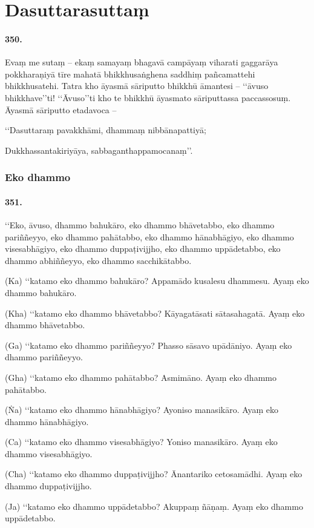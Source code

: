 \section{Dasuttarasuttaṃ}

\paragraph{350.} Evaṃ me sutaṃ – ekaṃ samayaṃ bhagavā campāyaṃ viharati gaggarāya pokkharaṇiyā tīre mahatā bhikkhusaṅghena saddhiṃ pañcamattehi bhikkhusatehi. Tatra kho āyasmā sāriputto bhikkhū āmantesi – ‘‘āvuso bhikkhave’’ti! ‘‘Āvuso’’ti kho te bhikkhū āyasmato sāriputtassa paccassosuṃ. Āyasmā sāriputto etadavoca –

‘‘Dasuttaraṃ pavakkhāmi, dhammaṃ nibbānapattiyā;

Dukkhassantakiriyāya, sabbaganthappamocanaṃ’’.

\subsubsection{Eko dhammo}

\paragraph{351.} ‘‘Eko, āvuso, dhammo bahukāro, eko dhammo bhāvetabbo, eko dhammo pariññeyyo, eko dhammo pahātabbo, eko dhammo hānabhāgiyo, eko dhammo visesabhāgiyo, eko dhammo duppaṭivijjho, eko dhammo uppādetabbo, eko dhammo abhiññeyyo, eko dhammo sacchikātabbo.

(Ka) ‘‘katamo eko dhammo bahukāro? Appamādo kusalesu dhammesu. Ayaṃ eko dhammo bahukāro.

(Kha) ‘‘katamo eko dhammo bhāvetabbo? Kāyagatāsati sātasahagatā. Ayaṃ eko dhammo bhāvetabbo.

(Ga) ‘‘katamo eko dhammo pariññeyyo? Phasso sāsavo upādāniyo. Ayaṃ eko dhammo pariññeyyo.

(Gha) ‘‘katamo eko dhammo pahātabbo? Asmimāno. Ayaṃ eko dhammo pahātabbo.

(Ṅa) ‘‘katamo eko dhammo hānabhāgiyo? Ayoniso manasikāro. Ayaṃ eko dhammo hānabhāgiyo.

(Ca) ‘‘katamo eko dhammo visesabhāgiyo? Yoniso manasikāro. Ayaṃ eko dhammo visesabhāgiyo.

(Cha) ‘‘katamo eko dhammo duppaṭivijjho? Ānantariko cetosamādhi. Ayaṃ eko dhammo duppaṭivijjho.

(Ja) ‘‘katamo eko dhammo uppādetabbo? Akuppaṃ ñāṇaṃ. Ayaṃ eko dhammo uppādetabbo.

